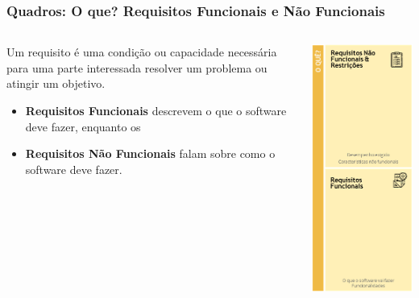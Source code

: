 \documentclass[aspectratio=169]{beamer}
\begin{document}
\begin{frame}
\frametitle{Quadros: O que? Requisitos Funcionais e Não Funcionais}

\begin{columns}
    

       \begin{column}{.66\textwidth}

Um requisito é uma condição ou capacidade necessária para uma parte interessada resolver um problema ou atingir um objetivo.
       
\begin{itemize}
    \item \textbf{Requisitos Funcionais} descrevem o que o software deve fazer, enquanto os 
    \item \textbf{Requisitos Não Funcionais} falam sobre como o software deve fazer.
\end{itemize}
   
        \end{column}
        \begin{column}{.33\textwidth}
\includegraphics[height=0.7\textheight]{detalhes/Oque.png} %
        \end{column}
    \end{columns}
\end{frame}
\end{document}

